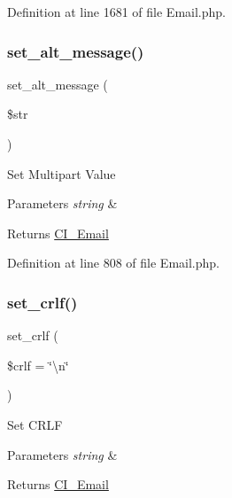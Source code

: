 Definition at line 1681 of file Email.\+php.

\mbox{\label{class_c_i___email_a18f0b650e6e9a859e1936a41e86fb3a6}} 
\subsubsection{\texorpdfstring{set\_alt\_message()}{set\_alt\_message()}}
{\footnotesize\ttfamily set\+\_\+alt\+\_\+message (\begin{DoxyParamCaption}\item[{}]{\$str }\end{DoxyParamCaption})}

Set Multipart Value


\begin{DoxyParams}{Parameters}
{\em string} & \\
\hline
\end{DoxyParams}
\begin{DoxyReturn}{Returns}
\mbox{\hyperlink{class_c_i___email}{C\+I\+\_\+\+Email}} 
\end{DoxyReturn}


Definition at line 808 of file Email.\+php.

\mbox{\label{class_c_i___email_a8bfdf8b14a9dcf4ee18b52c0a2afa833}} 
\subsubsection{\texorpdfstring{set\_crlf()}{set\_crlf()}}
{\footnotesize\ttfamily set\+\_\+crlf (\begin{DoxyParamCaption}\item[{}]{\$crlf = {\ttfamily \char`\"{}\textbackslash{}n\char`\"{}} }\end{DoxyParamCaption})}

Set C\+R\+LF


\begin{DoxyParams}{Parameters}
{\em string} & \\
\hline
\end{DoxyParams}
\begin{DoxyReturn}{Returns}
\mbox{\hyperlink{class_c_i___email}{C\+I\+\_\+\+Email}} 
\end{DoxyReturn}


